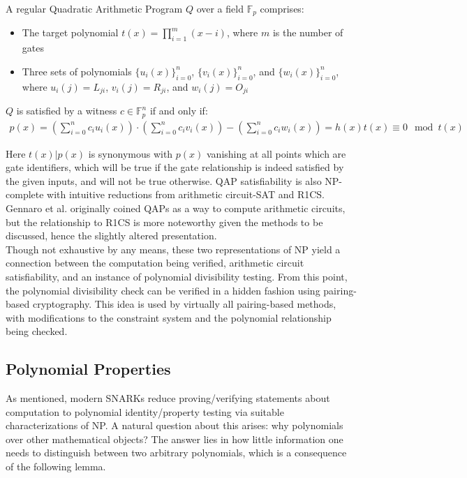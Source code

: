 \begin{definition}
A regular Quadratic Arithmetic Program $Q$ over a field $\mathbb{F}_p$ comprises:
\begin{itemize}
    \item The target polynomial $t(x) = \prod_{i=1}^m (x - i)$, where $m$ is the number of gates
    \item Three sets of polynomials $\{u_i(x)\}_{i=0}^n$, $\{v_i(x)\}_{i=0}^n$, and $\{w_i(x)\}_{i=0}^n$, where $u_i(j) = L_{ji}$, $v_i(j) = R_{ji}$, and $w_i(j) = O_{ji}$
\end{itemize}

$Q$ is satisfied by a witness $c \in \mathbb{F}_p^n$ if and only if:
\begin{align}
p(x) = \left(\sum_{i=0}^n c_i u_i(x)\right) \cdot \left(\sum_{i=0}^n c_i v_i(x)\right) - \left(\sum_{i=0}^n c_i w_i(x)\right) = h(x)t(x) \equiv 0 \mod t(x)
\end{align}
\end{definition}

\noindent Here $t(x) | p(x)$ is synonymous with $p(x)$ vanishing at all points which are gate identifiers, which will be true if the gate relationship is indeed satisfied by the given inputs, and will not be true otherwise. QAP satisfiability is also NP-complete with intuitive reductions from arithmetic circuit-SAT and R1CS. Gennaro et al. originally coined QAPs as a way to compute arithmetic circuits, but the relationship to R1CS is more noteworthy given the methods to be discussed, hence the slightly altered presentation.\\

\noindent Though not exhaustive by any means, these two representations of NP yield a connection between the computation being verified, arithmetic circuit satisfiability, and an instance of polynomial divisibility testing. From this point, the polynomial divisibility check can be verified in a hidden fashion using pairing-based cryptography. This idea is used by virtually all pairing-based methods, with modifications to the constraint system and the polynomial relationship being checked.

\subsection{Polynomial Properties}
\noindent As mentioned, modern SNARKs reduce proving/verifying statements about computation to polynomial identity/property testing via suitable characterizations of NP. A natural question about this arises: why polynomials over other mathematical objects? The answer lies in how little information one needs to distinguish between two arbitrary polynomials, which is a consequence of the following lemma.

